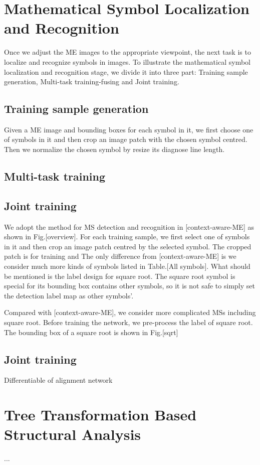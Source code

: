 \documentclass[10pt,conference,a4paper]{IEEEtran}
\begin{document}
	\section{Mathematical Symbol Localization and Recognition}
	Once we adjust the ME images to the appropriate viewpoint, the next task is to localize and recognize symbols in images. To illustrate the mathematical symbol localization and recognition stage, we divide it into three part: Training sample generation, Multi-task training-fusing and Joint training.
	\subsection{Training sample generation}
	Given a ME image and bounding boxes for each symbol in it, we first choose one of symbols in it and then crop an image patch with the chosen symbol centred. Then we normalize the chosen symbol by resize its diagnose line length.
	\subsection{Multi-task training}
	\subsection{Joint training}
	We adopt the method for MS detection and recognition in [context-aware-ME] as shown in Fig.[overview]. For each training sample, we first select one of symbols in it and then crop an image patch centred by the selected symbol. The cropped patch is for training and 
	The only difference from [context-aware-ME] is we consider much more kinds of symbols listed in Table.[All symbols]. What should be mentioned is the label design for square root. The square root symbol is special for its bounding box contains other symbols, so it is not safe to simply set the detection label map as other symbols'. 
	
	
	
	Compared with [context-aware-ME], we consider more complicated MSs including square root.
	Before training the network, we pre-process the label of square root. 
	The bounding box of a square root is shown in Fig.[sqrt]
	
	\subsection{Joint training}
	Differentiable of alignment network
	\section{Tree Transformation Based Structural Analysis}
	...
\end{document}
